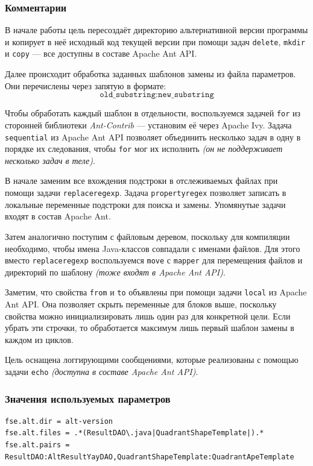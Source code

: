 \subsubsection{Комментарии}

В начале работы цель пересоздаёт директорию альтернативной версии программы и копирует в неё исходный код текущей версии при помощи задач \texttt{delete}, \texttt{mkdir} и \texttt{copy} --- все доступны в составе Apache Ant API.

Далее происходит обработка заданных шаблонов замены из файла параметров. Они перечислены через запятую в формате:
\[
  \texttt{old\_substring:new\_substring}
\]

Чтобы обработать каждый шаблон в отдельности, воспользуемся задачей \texttt{for} из сторонней библиотеки \textit{Ant-Contrib} --- установим её через Apache Ivy. Задача \texttt{sequential} из Apache Ant API позволяет объединить несколько задач в одну в порядке их следования, чтобы \texttt{for} мог их исполнить \textit{(он не поддерживает несколько задач в теле)}.

В начале заменим все вхождения подстроки в отслеживаемых файлах при помощи задачи \texttt{replaceregexp}. Задача \texttt{propertyregex} позволяет записать в локальные переменные подстроки для поиска и замены. Упомянутые задачи входят в состав Apache Ant.

Затем аналогично поступим с файловым деревом, поскольку для компиляции необходимо, чтобы имена Java-классов совпадали с именами файлов. Для этого вместо \texttt{replaceregexp} воспользуемся \texttt{move} с \texttt{mapper} для перемещения файлов и директорий по шаблону \textit{(тоже входят в Apache Ant API)}.

Заметим, что свойства \texttt{from} и \texttt{to} объявлены при помощи задачи \texttt{local} из Apache Ant API. Она позволяет скрыть переменные для блоков выше, поскольку свойства можно инициализировать лишь один раз для конкретной цели. Если убрать эти строчки, то обработается максимум лишь первый шаблон замены в каждом из циклов.

Цель оснащена логгирующими сообщениями, которые реализованы с помощью задачи \texttt{echo} \textit{(доступна в составе Apache Ant API)}.

\subsubsection{Значения используемых параметров}

\begin{lstlisting}[language=Properties,caption={Часть содержимого файла \texttt{build.properties}},captionpos=b]
fse.alt.dir = alt-version
fse.alt.files = .*(ResultDAO\.java|QuadrantShapeTemplate|).*
fse.alt.pairs = ResultDAO:AltResultYayDAO,QuadrantShapeTemplate:QuadrantApeTemplate
\end{lstlisting}

